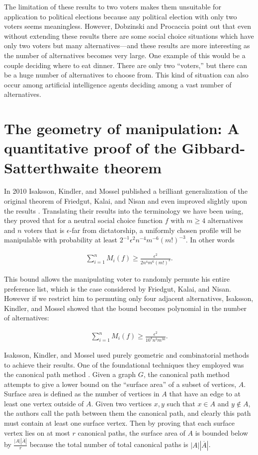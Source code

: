 	The limitation of these results to two voters makes them unsuitable for application to political elections because any political election with only two voters seems meaningless. However, Dobzinski and Procaccia point out that even without extending these results there are some social choice situations which have only two voters but many alternatives---and these results are more interesting as the number of alternatives becomes very large. One example of this would be a couple deciding where to eat dinner. There are only two ``voters,'' but there can be a huge number of alternatives to choose from. This kind of situation can also occur among artificial intelligence agents deciding among a vast number of alternatives.


\section{The geometry of manipulation: A quantitative proof of the Gibbard-Satterthwaite theorem}

	In 2010 Isaksson, Kindler, and Mossel published a brilliant generalization of the original theorem of Friedgut, Kalai, and Nisan and even improved slightly upon the results \cite{isaksson2010geometry}. Translating their results into the terminology we have been using, they proved that for a neutral social choice function $f$ with $m \ge 4$ alternatives and $n$ voters that is $\epsilon$-far from dictatorship, a uniformly chosen profile will be manipulable with probability at least $2^{-1} \epsilon^2 n^{-4} m^{-6} (m!)^{-3}$. In other words

	\begin{align*}
		\sum_{i=1}^n M_i(f) \ge \frac{\epsilon^2}{2 n^4 m^6 (m!)^3}.
	\end{align*}

	This bound allows the manipulating voter to randomly permute his entire preference list, which is the case considered by Friedgut, Kalai, and Nisan. However if we restrict him to permuting only four adjacent alternatives, Isaksson, Kindler, and Mossel showed that the bound becomes polynomial in the number of alternatives:

	\begin{align*}
		\sum_{i=1}^n M_i(f) \ge \frac{\epsilon^2}{10^4 n^3 m^{30}}.
	\end{align*}

	Isaksson, Kindler, and Mossel used purely geometric and combinatorial methods to achieve their results. One of the foundational techniques they employed was the canonical path method \cite{jerrum1993polynomial}. Given a graph $G$, the canonical path method attempts to give a lower bound on the ``surface area'' of a subset of vertices, $A$. Surface area is defined as the number of vertices in $A$ that have an edge to at least one vertex outside of $A$. Given two vertices $x, y$ such that $x \in A$ and $y \notin A$, the authors call the path between them the canonical path, and clearly this path must contain at least one surface vertex. Then by proving that each surface vertex lies on at most $r$ canonical paths, the surface area of $A$ is bounded below by $\frac{|A| |\overline{A}|}{r}$ because the total number of total canonical paths is $|A| |\overline{A}|$.

